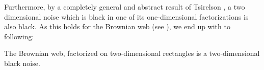{Furthermore, by a completely general and abstract result
of Tsirelson , a two dimensional noise which is
black in one of its one-dimensional factorizations is also
black. As this holds for the Brownian web (see ),
we end up with to following:

\begin{theorem}
The Brownian web, factorized on two-dimensional rectangles is a two-dimensional black noise.
\end{theorem}



}
